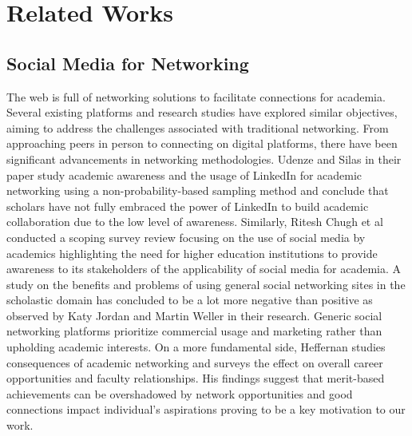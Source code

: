 \section{Related Works}
\subsection{Social Media for Networking} The web is full of networking solutions to facilitate connections for academia. Several existing platforms and research studies have explored similar objectives, aiming to address the challenges associated with traditional networking. From approaching peers in person to connecting on digital platforms, there have been significant advancements in networking methodologies. Udenze and Silas \cite{ref1} in their paper study academic awareness and the usage of LinkedIn for academic networking using a non-probability-based sampling method and conclude that scholars have not fully embraced the power of LinkedIn to build academic collaboration due to the low level of awareness. Similarly, Ritesh Chugh et al \cite{ref11} conducted a scoping survey review focusing on the use of social media by academics highlighting the need for higher education institutions to provide awareness to its stakeholders of the applicability of social media for academia. A study on the benefits and problems of using general social networking sites in the scholastic domain has concluded to be a lot more negative than positive as observed by Katy Jordan and Martin Weller \cite{ref2} in their research. Generic social networking platforms prioritize commercial usage and marketing rather than upholding academic interests. On a more fundamental side, Heffernan \cite{ref12} studies consequences of academic networking and surveys the effect on overall career opportunities and faculty relationships. His findings suggest that merit-based achievements can be overshadowed by network opportunities and good connections impact individual's aspirations proving to be a key motivation to our work.

